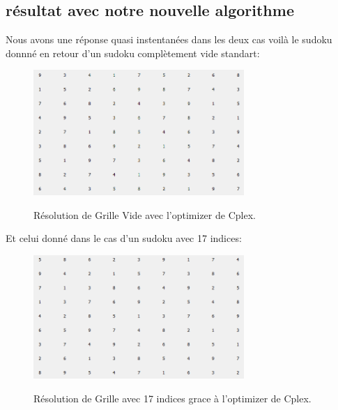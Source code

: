 \subsection{résultat avec notre nouvelle algorithme}
Nous avons une réponse quasi instentanées dans les deux cas voilà le sudoku donnné en retour d'un sudoku complètement vide standart:

\begin{figure}[h]
  \begin{center}
\includegraphics[width=8cm]{./images/Res_Vide.png}\label{Test_Cplex}
\caption{Résolution de Grille Vide avec l'optimizer de Cplex.}
\end{center}
\end{figure}
\newline
Et celui donné dans le cas d'un sudoku avec 17 indices:\newline

\begin{figure}[h]
  \begin{center}
\includegraphics[width=8cm]{./images/Res_17.png}\label{Test_Cplex}
\caption{Résolution de Grille avec 17 indices grace à l'optimizer de Cplex.}
\end{center}
\end{figure}
